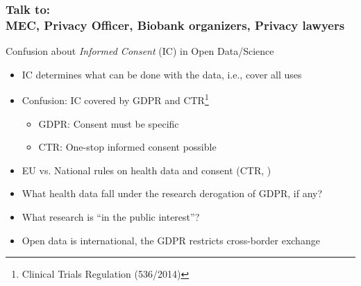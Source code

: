 \documentclass[xcolor=dvipsnames]{beamer}
\begin{document}
\begin{frame}
	\frametitle{Talk to: \\
	MEC, Privacy Officer, Biobank organizers, Privacy lawyers}
	
	\begin{block}{Confusion about {\em Informed Consent} (IC) in Open Data/Science}
	\begin{itemize}
	\item IC determines what can be done with the data, i.e., cover all uses
	\item Confusion: IC covered by GDPR and CTR\footnote[frame]{Clinical Trials Regulation (536/2014)} {\scriptsize \cite{EU2014CTR,schneider2016deciphering}}
	\begin{itemize}
	\item GDPR: Consent must be specific {\scriptsize \cite{GDPR_EU,chassang2017impact}}
	\item CTR: One-stop informed consent possible {\scriptsize \cite{mende2017principles,dittrich2015esmod}}
	\end{itemize}
	\item EU vs. National rules on health data and consent (CTR, {\scriptsize\cite{chassang2017impact}})
	\item What health data fall under the research derogation of GDPR, if any?
	\item What research is ``in the public interest''?
	\item Open data is international, the GDPR restricts cross-border exchange
	\end{itemize}
	\end{block}	
\end{frame}
\end{document}
